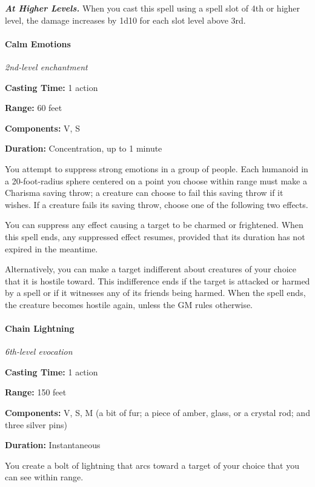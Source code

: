 \documentclass[
]{article}
\begin{document}
\emph{\textbf{At Higher Levels.}} When you cast this spell using a spell
slot of 4th or higher level, the damage increases by 1d10 for each slot
level above 3rd.

\hypertarget{calm-emotions}{%
\paragraph{Calm Emotions}\label{calm-emotions}}

\emph{2nd-level enchantment}

\textbf{Casting Time:} 1 action

\textbf{Range:} 60 feet

\textbf{Components:} V, S

\textbf{Duration:} Concentration, up to 1 minute

You attempt to suppress strong emotions in a group of people. Each
humanoid in a 20-foot-radius sphere centered on a point you choose
within range must make a Charisma saving throw; a creature can choose to
fail this saving throw if it wishes. If a creature fails its saving
throw, choose one of the following two effects.

You can suppress any effect causing a target to be charmed or
frightened. When this spell ends, any suppressed effect resumes,
provided that its duration has not expired in the meantime.

Alternatively, you can make a target indifferent about creatures of your
choice that it is hostile toward. This indifference ends if the target
is attacked or harmed by a spell or if it witnesses any of its friends
being harmed. When the spell ends, the creature becomes hostile again,
unless the GM rules otherwise.

\hypertarget{chain-lightning}{%
\paragraph{Chain Lightning}\label{chain-lightning}}

\emph{6th-level evocation}

\textbf{Casting Time:} 1 action

\textbf{Range:} 150 feet

\textbf{Components:} V, S, M (a bit of fur; a piece of amber, glass, or
a crystal rod; and three silver pins)

\textbf{Duration:} Instantaneous

You create a bolt of lightning that arcs toward a target of your choice
that you can see within range.
\end{document}
